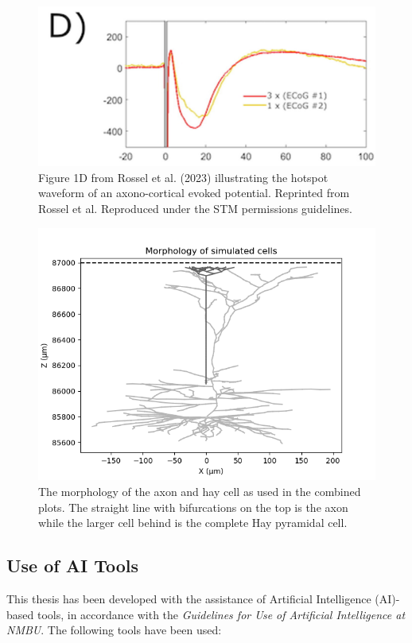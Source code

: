 \documentclass[final, a4paper,masters,en,listoffigures,listoftables,norwegiandates]{NMBU}
\begin{document}
\begin{figure}[htbp]
    \centering
    \includegraphics[width=\linewidth]{Figures/Rosselfig1d.jpg}
    \caption[ACEP waveform hotspot (Rossel et al., 2023) ]{%
    Figure 1D from Rossel et al. (2023) illustrating the hotspot waveform of an axono-cortical evoked potential.%
    \footnotesize Reprinted from Rossel et al. \cite{ROSSEL2023} Reproduced under the STM permissions guidelines.
    }
    \label{fig:rossel}
\end{figure}

\begin{figure}[htbp]
    \centering
    \includegraphics[width=\linewidth]{Figures/singlecombined.png}
    \caption{The morphology of the axon and hay cell as used in the combined plots. The straight line with bifurcations on the top is the axon while the larger cell behind is the complete Hay pyramidal cell.}
    \label{fig:combinedmorph}
\end{figure}

\newpage
\subsection{Use of AI Tools}
This thesis has been developed with the assistance of Artificial Intelligence (AI)-based tools, in accordance with the \textit{Guidelines for Use of Artificial Intelligence at NMBU}. The following tools have been used:
\end{document}
